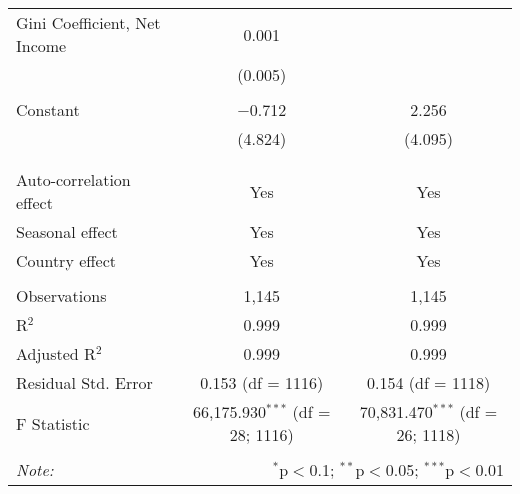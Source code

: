\begin{table}[!htbp]
\begin{tabular}{@{\extracolsep{5pt}}lcc}
 Gini Coefficient, Net Income & 0.001 &  \\ 
  & (0.005) &  \\ 
  & & \\ 
 Constant & $-$0.712 & 2.256 \\ 
  & (4.824) & (4.095) \\ 
  & & \\ 
\hline \\[-1.8ex] 
Auto-correlation effect & Yes & Yes \\ 
Seasonal effect & Yes & Yes \\ 
Country effect & Yes & Yes \\ 
\hline \\[-1.8ex] 
Observations & 1,145 & 1,145 \\ 
R$^{2}$ & 0.999 & 0.999 \\ 
Adjusted R$^{2}$ & 0.999 & 0.999 \\ 
Residual Std. Error & 0.153 (df = 1116) & 0.154 (df = 1118) \\ 
F Statistic & 66,175.930$^{***}$ (df = 28; 1116) & 70,831.470$^{***}$ (df = 26; 1118) \\ 
\hline 
\hline \\[-1.8ex] 
\textit{Note:}  & \multicolumn{2}{r}{$^{*}$p$<$0.1; $^{**}$p$<$0.05; $^{***}$p$<$0.01} \\ 
\end{tabular} 
\end{table} 
